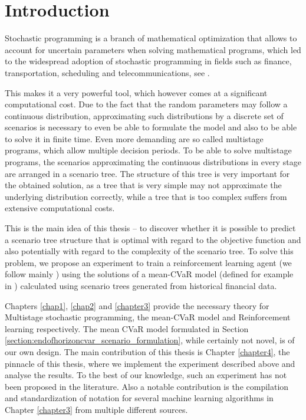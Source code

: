 \chapter*{Introduction}
Stochastic programming is a branch of mathematical optimization that allows to account for uncertain parameters when solving mathematical programs, which led to the widespread adoption of stochastic programming in fields such as finance, transportation, scheduling and telecommunications, see \cite{stochasticprogrammingbible2009}. 

This makes it a very powerful tool, which however comes at a significant computational cost. Due to the fact that the random parameters may follow a continuous distribution, approximating such distributions by a discrete set of scenarios is necessary to even be able to formulate the model and also to be able to solve it in finite time. Even more demanding are so called multistage programs, which allow multiple decision periods. To be able to solve multistage programs, the scenarios approximating the continuous distributions in every stage are arranged in a scenario tree. The structure of this tree is very important for the obtained solution, as a tree that is very simple may not approximate the underlying distribution correctly, while a tree that is too complex suffers from extensive computational costs. 

This is the main idea of this thesis -- to discover whether it is possible to predict a scenario tree structure that is optimal with regard to the objective function and also potentially with regard to the complexity of the scenario tree. To solve this problem, we propose an experiment to train a reinforcement learning agent (we follow mainly \cite{sutton2018reinforcement}) using the solutions of a mean-CVaR model (defined for example in \cite{cvar_robust_mean_cvar_portfolio_optimization}) calculated using scenario trees generated from historical financial data. 

Chapters \ref{chap1}, \ref{chap2} and \ref{chapter3} provide the necessary theory for Multistage stochastic programming, the mean-CVaR model and Reinforcement learning respectively. The mean CVaR model formulated in Section \ref{section:endofhorizoncvar_scenario_formulation}, while certainly not novel, is of our own design.  The main contribution of this thesis is Chapter \ref{chapter4}, the pinnacle of this thesis, where we implement the experiment described above and analyse the results. To the best of our knowledge, such an experiment has not been proposed in the literature. Also a notable contribution is the compilation and standardization of notation for several machine learning algorithms in Chapter \ref{chapter3} from multiple different sources.
